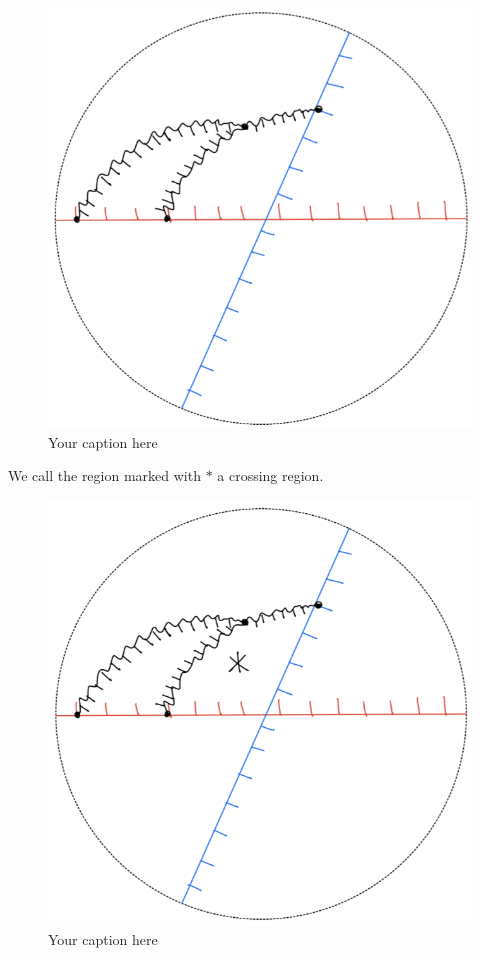 \begin{definition}
\begin{enumerate}[label = (\roman*)]
\begin{itemize}
\begin{figure}[H]
    \includegraphics[scale = 0.95]{diagrams/local_systems_on_as_diagrams/4.png} 
    \caption{Your caption here}
    \label{fig:your-label}
\end{figure}
We call the region marked with $*$ a crossing region.
\begin{figure}[H] 
    \centering
    \includegraphics[scale = 0.95]{diagrams/local_systems_on_as_diagrams/5.png} 
    \caption{Your caption here}
    \label{fig:your-label}
\end{figure}


\end{itemize}
\end{enumerate}
\end{definition}
